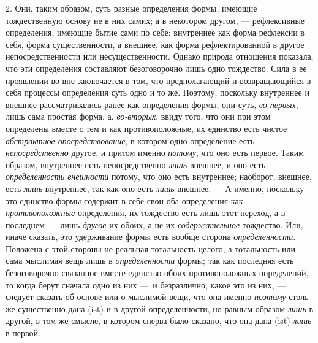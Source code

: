 2. Они, таким образом, суть разные определения формы, имеющие тождественную
основу не в них самих; а в некотором другом, — рефлексивные определения,
имеющие бытие сами по себе: внутреннее как форма рефлексии в себя, форма
существенности, а внешнее, как форма рефлектированной в другое
непосредственности или несущественности. Однако природа отношения показала,
что эти определения составляют безоговорочно лишь одно тождество. Сила в ее
проявлении во вне заключается в том, что предполагающий и возвращающийся в
себя процессы определения суть одно и то же. Поэтому, поскольку внутреннее
и внешнее рассматривались ранее как определения формы, они суть,
{\em во-первых}, лишь сама простая форма, а,
{\em во-вторых}, ввиду того, что они при этом
определены вместе с тем и как противоположные, их единство есть чистое
{\em абстрактное опосредствование}, в котором одно
определение есть {\em непосредственно} другое, и притом
именно {\em потому}, что оно есть первое. Таким
образом, внутреннее есть непосредственно {\em лишь}
внешнее, и оно есть {\em определенность внешности}
потому, что оно есть внутреннее; наоборот, внешнее, есть
{\em лишь} внутреннее, так как оно есть
{\em лишь} внешнее. — А именно, поскольку это единство
формы содержит в себе свои оба определения как
{\em противоположные} определения, их тождество есть
лишь этот переход, а в последнем —~лишь {\em другое} их
обоих, а не их {\em содержательное} тождество. Или,
иначе сказать, это удерживание формы есть вообще сторона
{\em определенности}. Положена с этой стороны не
реальная тотальность целого, а тотальность или сама мыслимая вещь лишь в
{\em определенности} формы; так как последняя есть
безоговорочно связанное вместе единство обоих противоположных определений,
то когда берут сначала одно из них —~и безразлично, какое это из них, —
следует сказать об основе или о мыслимой вещи, что она именно
{\em поэтому} столь же существенно дана (ist) и в
другой определенности, но равным образом {\em лишь} в
другой, в том же смысле, в котором сперва было сказано, что она дана (ist)
{\em лишь} в первой. —

